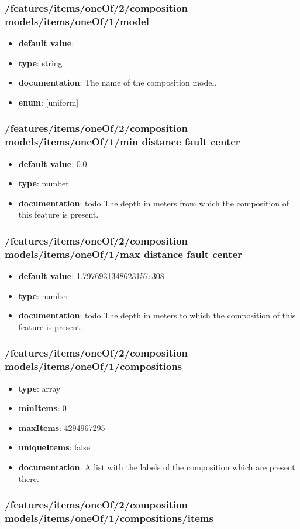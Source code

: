 \subsubsection{/features/items/oneOf/2/composition models/items/oneOf/1/model}
\begin{itemize}\item {\bf default value}: 
\item {\bf type}: string
\item {\bf documentation}: The name of the composition model.
\item {\bf enum}: [uniform]\end{itemize}\subsubsection{/features/items/oneOf/2/composition models/items/oneOf/1/min distance fault center}
\begin{itemize}\item {\bf default value}: 0.0
\item {\bf type}: number
\item {\bf documentation}: todo The depth in meters from which the composition of this feature is present.
\end{itemize}\subsubsection{/features/items/oneOf/2/composition models/items/oneOf/1/max distance fault center}
\begin{itemize}\item {\bf default value}: 1.7976931348623157e308
\item {\bf type}: number
\item {\bf documentation}: todo The depth in meters to which the composition of this feature is present.
\end{itemize}\subsubsection{/features/items/oneOf/2/composition models/items/oneOf/1/compositions}
\begin{itemize}\item {\bf type}: array
\item {\bf minItems}: 0
\item {\bf maxItems}: 4294967295
\item {\bf uniqueItems}: false
\item {\bf documentation}: A list with the labels of the composition which are present there.
\end{itemize}\subsubsection{/features/items/oneOf/2/composition models/items/oneOf/1/compositions/items}
